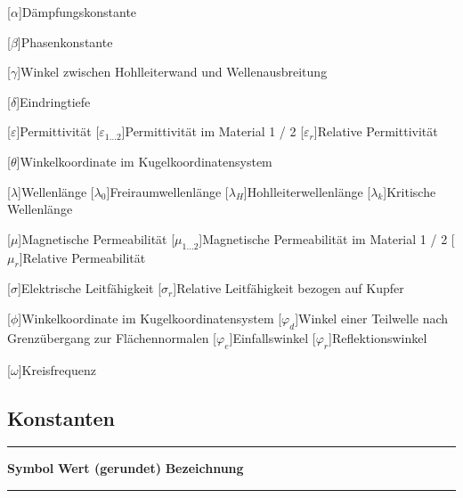 \begin{acronym}[Platzhalterwort]
[$\alpha$]{\acrounit{-}Dämpfungskonstante}

[$\beta$]{\acrounit{-}Phasenkonstante}

[$\gamma$]{\acrounit{\radian}Winkel zwischen Hohlleiterwand und Wellenausbreitung}

[$\delta$]{\acrounit{\meter}Eindringtiefe}

[$\varepsilon$]{\acrounit{\ampere\second\per\volt\per\meter}Permittivität}
[$\varepsilon_{1\ldots2}$]{Permittivität im Material 1 / 2}
[$\varepsilon_r$]{Relative Permittivität}

[$\theta$]{\acrounit{\radian}Winkelkoordinate im Kugelkoordinatensystem}

[$\lambda$]{\acrounit{\meter}Wellenlänge}
[$\lambda_0$]{\acrounit{\meter}Freiraumwellenlänge}
[$\lambda_H$]{\acrounit{\meter}Hohlleiterwellenlänge}
[$\lambda_k$]{\acrounit{\meter}Kritische Wellenlänge}

[$\mu$]{\acrounit{\volt\second\per\ampere\per\meter}Magnetische Permeabilität}
[$\mu_{1\ldots2}$]{\acrounit{\volt\second\per\ampere\per\meter}Magnetische Permeabilität im Material 1 / 2}
[$\mu_r$]{Relative Permeabilität}

[$\sigma$]{\acrounit{\per\ohm\per\meter}Elektrische Leitfähigkeit}
[$\sigma_r$]{Relative Leitfähigkeit bezogen auf Kupfer}

[$\phi$]{\acrounit{\radian}Winkelkoordinate im Kugelkoordinatensystem}
[$\varphi_d$]{\acrounit{\radian}Winkel einer Teilwelle nach Grenzübergang zur Flächennormalen}
[$\varphi_e$]{\acrounit{\radian}Einfallswinkel}
[$\varphi_r$]{\acrounit{\radian}Reflektionswinkel}

[$\omega$]{\acrounit{\per\second}Kreisfrequenz}

\end{acronym}


\newpage



\subsection*{Konstanten}
\noindent\rule{\textwidth}{0.5pt}
\textbf{Symbol} \hspace{12.5mm} \textbf{Wert (gerundet)} \hspace{21mm} \textbf{Bezeichnung} \\[-\linespace]
\noindent\rule{\textwidth}{0.5pt}


